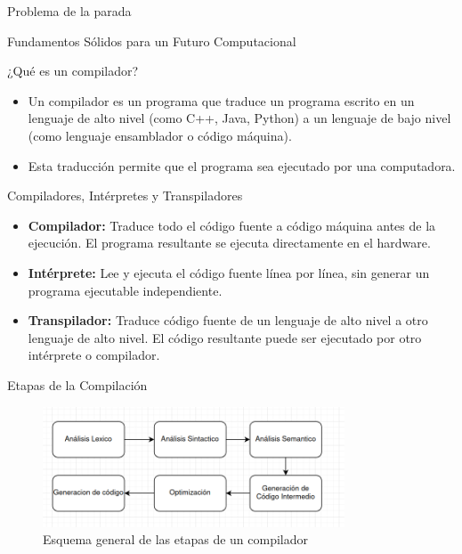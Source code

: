 \documentclass{beamer}
\begin{document}
\begin{frame}{Problema de la parada}
\begin{frame}{Fundamentos Sólidos para un Futuro Computacional}
	\end{frame}
	
	
	\begin{frame}{¿Qué es un compilador?}
		
		\begin{itemize}
			\item Un compilador es un programa que traduce un programa escrito en un lenguaje de alto nivel (como C++, Java, Python) a un lenguaje de bajo nivel (como lenguaje ensamblador o código máquina).
			\item Esta traducción permite que el programa sea ejecutado por una computadora.
		\end{itemize}
		
	\end{frame}
	
	\begin{frame}{Compiladores, Intérpretes y Transpiladores}
		
		\begin{itemize}
			\item \textbf{Compilador:} Traduce todo el código fuente a código máquina antes de la ejecución. El programa resultante se ejecuta directamente en el hardware.
			\item \textbf{Intérprete:} Lee y ejecuta el código fuente línea por línea, sin generar un programa ejecutable independiente.
			\item \textbf{Transpilador:} Traduce código fuente de un lenguaje de alto nivel a otro lenguaje de alto nivel. El código resultante puede ser ejecutado por otro intérprete o compilador.
		\end{itemize}
		
	\end{frame}
	
	\begin{frame}{Etapas de la Compilación}
		
		\begin{figure}
			\includegraphics[width=0.8\textwidth]{diagrama_compilador.png} %
			\caption{Esquema general de las etapas de un compilador}
		\end{figure}
		

\end{frame}
\end{frame}
\end{document}
